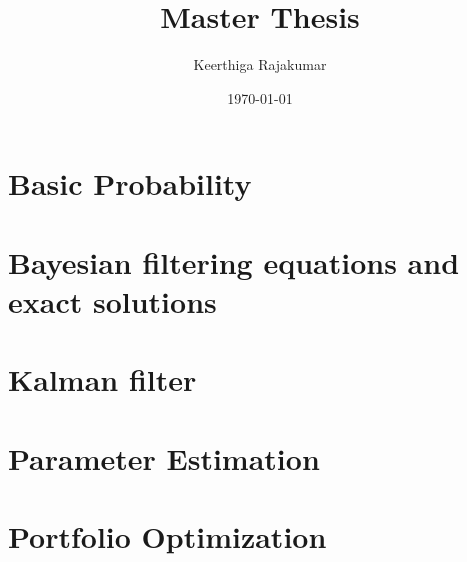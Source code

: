 \documentclass{article}
\title{Master Thesis}
\author{Keerthiga Rajakumar}
\date{\today}
\theoremstyle{plain} %
\theoremstyle{definition} %
\theoremstyle{remark} %
\begin{document}

\maketitle
\newpage

\tableofcontents %

\newpage

\setcounter{page}{1} %

\section{Basic Probability}


\newpage
\section{Bayesian filtering equations and exact solutions}


\newpage
\section{Kalman filter}


\newpage
\section{Parameter Estimation}


\newpage
\section{Portfolio Optimization}

\end{document}
